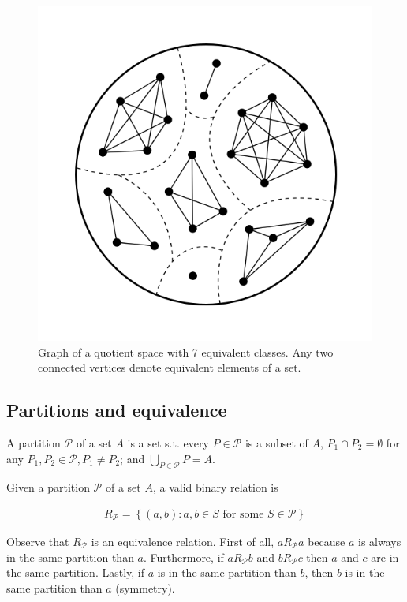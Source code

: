 \documentclass[a4paper, 12pt]{article}
\begin{document}
\begin{figure}
    \caption{Graph of a quotient space with 7 equivalent classes. Any two
    connected vertices denote equivalent elements of a set.}
\centering
\includegraphics[scale=0.3]{equiv}
\end{figure}



\subsection{Partitions and equivalence}

A partition $\mathcal{P}$ of a set $A$ is a set s.t. every $P \in \mathcal{P}$
is a subset of $A$, $P_1 \cap P_2 = \emptyset$ for any $P_1, P_2 \in
\mathcal{P}, P_1 \neq P_2$; and $\bigcup_{P \in \mathcal{P}} P = A$.

Given a partition $\mathcal{P}$ of a set $A$, a valid binary relation is 

\begin{align*}
    R_{\mathcal{P}} = \left\{ (a, b) : a, b \in  S \text{ for some } S \in
    \mathcal{P} \right\} 
\end{align*}

Observe that $R_{\mathcal{P}}$ is an equivalence relation. First of all,
$aR_{\mathcal{P}}a$ because $a$ is always in the same partition than $a$.
Furthermore, if $aR_{\mathcal{P}}b$ and $bR_{\mathcal{P}}c$ then $a$ and $c$ are
in the same partition. Lastly, if $a$ is in the same partition than $b$, then
$b$ is in the same partition than $a$ (symmetry).
\end{document}
